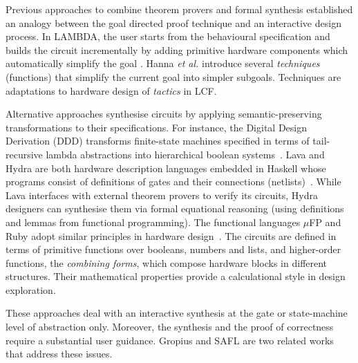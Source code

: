 Previous approaches to combine theorem provers 
and formal synthesis established an analogy between
the goal directed proof technique and an interactive 
design process. In LAMBDA, the user starts from the behavioural
specification and builds the circuit incrementally
by adding primitive hardware components
which automatically simplify the goal \cite{Fou89}.
Hanna {\em et al.\/} \cite{HLD89} introduce
several {\em techniques\/} (functions) that
simplify the current goal into simpler subgoals.
Techniques are adaptations to hardware design
of {\em tactics\/} in LCF.

Alternative approaches synthesise circuits
by applying semantic-preserving transformations
to their specifications. For instance,
the Digital Design Derivation (DDD) transforms
finite-state machines specified in terms of
tail-recursive lambda abstractions into hierarchical
boolean systems~\cite{Johnson90}. Lava and Hydra
are both hardware description languages embedded
in Haskell whose programs
consist of definitions of gates and their 
connections (netlists)~\cite{BCSS99,OD02}. While Lava interfaces with
external theorem provers to verify its circuits,
Hydra designers can synthesise them
via formal equational reasoning
(using definitions and lemmas from functional programming).
The functional languages $\mu$FP and Ruby
adopt similar principles in hardware design~\cite{JS90,She84}.
The circuits are defined in terms of primitive
functions over booleans, numbers and lists, and
higher-order functions, the {\em combining forms\/},
which compose hardware blocks in different
structures. Their mathematical properties provide
a calculational style in design exploration.

These approaches deal with an interactive
synthesis at the gate or state-machine level
of abstraction only. Moreover, the synthesis
and the proof of correctness require a 
substantial user guidance. Gropius and SAFL 
are two related works that address these issues.

